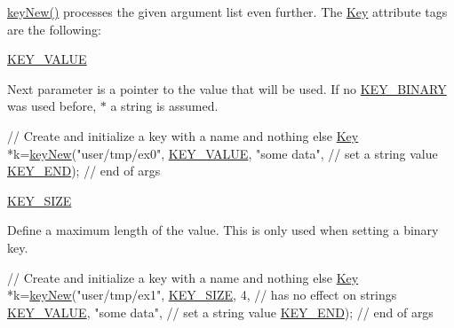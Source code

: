 \hyperlink{group__key_gad23c65b44bf48d773759e1f9a4d43b89}{key\-New()} processes the given argument list even further. The \hyperlink{classkdb_1_1Key}{Key} attribute tags are the following\-:
\begin{DoxyItemize}
\item \hyperlink{group__key_gga91fb3178848bd682000958089abbaf40ac66e4a49d09212b79f5754ca6db5bd2e}{K\-E\-Y\-\_\-\-V\-A\-L\-U\-E} \par
 Next parameter is a pointer to the value that will be used. If no \hyperlink{group__key_gga91fb3178848bd682000958089abbaf40a1ca18d4e094ae7487d35ecedda2235ff}{K\-E\-Y\-\_\-\-B\-I\-N\-A\-R\-Y} was used before, $\ast$ a string is assumed. 
\begin{DoxyCodeInclude}
\textcolor{comment}{// Create and initialize a key with a name and nothing else}
\hyperlink{classkdb_1_1Key_a5679f5cae63caddd64a60388b9cc77fa}{Key} *k=\hyperlink{group__key_gad23c65b44bf48d773759e1f9a4d43b89}{keyNew}(\textcolor{stringliteral}{"user/tmp/ex0"},
        \hyperlink{group__key_gga91fb3178848bd682000958089abbaf40ac66e4a49d09212b79f5754ca6db5bd2e}{KEY\_VALUE}, \textcolor{stringliteral}{"some data"},    \textcolor{comment}{// set a string value}
        \hyperlink{group__key_gga91fb3178848bd682000958089abbaf40aa8adb6fcb92dec58fb19410eacfdd403}{KEY\_END});                  \textcolor{comment}{// end of args}
\end{DoxyCodeInclude}

\item \hyperlink{group__key_gga91fb3178848bd682000958089abbaf40a6d531b5c41445d19d0452eebdccbfa01}{K\-E\-Y\-\_\-\-S\-I\-Z\-E} \par
 Define a maximum length of the value. This is only used when setting a binary key. 
\begin{DoxyCodeInclude}
\textcolor{comment}{// Create and initialize a key with a name and nothing else}
\hyperlink{classkdb_1_1Key_a5679f5cae63caddd64a60388b9cc77fa}{Key} *k=\hyperlink{group__key_gad23c65b44bf48d773759e1f9a4d43b89}{keyNew}(\textcolor{stringliteral}{"user/tmp/ex1"},
        \hyperlink{group__key_gga91fb3178848bd682000958089abbaf40a6d531b5c41445d19d0452eebdccbfa01}{KEY\_SIZE}, 4,               \textcolor{comment}{// has no effect on strings}
        \hyperlink{group__key_gga91fb3178848bd682000958089abbaf40ac66e4a49d09212b79f5754ca6db5bd2e}{KEY\_VALUE}, \textcolor{stringliteral}{"some data"},    \textcolor{comment}{// set a string value}
        \hyperlink{group__key_gga91fb3178848bd682000958089abbaf40aa8adb6fcb92dec58fb19410eacfdd403}{KEY\_END});                  \textcolor{comment}{// end of args}
\end{DoxyCodeInclude}


\end{DoxyItemize}
